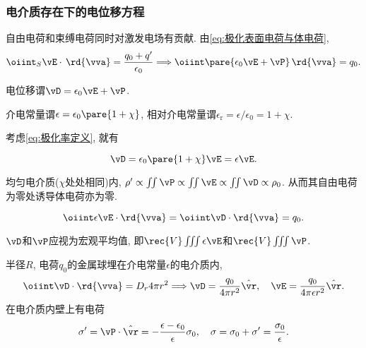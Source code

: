 \documentclass[../Electromagnetism.tex]{subfiles}
\begin{document}
\subsubsection{电介质存在下的电位移方程} %
\label{ssub:电介质存在下的电位移方程}

自由电荷和束缚电荷同时对激发电场有贡献. 由\eqref{eq:极化表面电荷与体电荷},
\[ \oiint_S \vE\cdot\,\rd{\vva} = \frac{q_0 + q'}{\epsilon_0} \Longrightarrow \oiint \pare{\epsilon_0 \vE + \vP}\,\rd{\vva} = q_0. \]
\begin{definition}[电位移]
	电位移谓$\vD = \epsilon_0 \vE + \vP$.
\end{definition}
\begin{definition}[介电常量和相对介电常量]
	介电常量谓$\epsilon = \epsilon_0 \pare{1+\chi}$, 相对介电常量谓$\epsilon_{\mathrm{r}} = \epsilon/\epsilon_0 = 1+\chi$.
\end{definition}
考虑\eqref{eq:极化率定义}, 就有
\begin{finale}
	\[ \vD = \epsilon_0\pare{1+\chi}\vE = \epsilon \vE. \]
\end{finale}
\begin{ex}
	均匀电介质($\chi$处处相同)内, $\rho' \propto \iint \vP \propto \iint \vE \propto \iint \vD \propto \rho_0$. 从而其自由电荷为零处诱导体电荷亦为零.
\end{ex}
\begin{finale}
	\begin{corollary}[电介质存在时的Gau\ss 定律]
		\begin{equation}
			\label{eq:电介质存在时的Gauss定律}
			\oiint \epsilon\vE\cdot\rd{\vva} = \oiint \vD\cdot\rd{\vva} = q_0.
		\end{equation}
	\end{corollary}
\end{finale}
\begin{remark}
	$\vD$和$\vP$应视为宏观平均值, 即$\rec{V}\iiint \epsilon \vE$和$\rec{V}\iiint \vP$.
\end{remark}
\begin{ex}
	\label{ex:带电金属球在均匀电介质内}
	半径$R$, 电荷$q_0$的金属球埋在介电常量$\epsilon$的电介质内,
	\[ \oiint \vD\cdot\rd{\vva} = D_r 4\pi r^2\Longrightarrow \vD = \frac{q_0}{4\pi r^2}\hat{\vr},\quad \vE = \frac{q_0}{4\pi\epsilon r^2}\hat{\vr}.\]
	在电介质内壁上有电荷
	\begin{equation}
		\label{eq:电介质内壁上电荷}
	 	\sigma' = \vP\cdot\hat{\vr} = -\frac{\epsilon - \epsilon_0}{\epsilon}\sigma_0,\quad \sigma = \sigma_0 + \sigma' = \frac{\sigma_0}{\epsilon}.
	\end{equation}
\end{ex}
\end{document}
